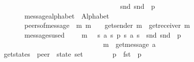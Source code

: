 \begin{isabellebody}
\ \ \ \ \ \ \ \ \ \ \ \ \ \ \ \ \ \ \ \ \ \ \ \ \ \ \ \ \ \ \ \ \ \ \ {\isacharparenleft}{\kern0pt}snd\ {\isacharparenleft}{\kern0pt}snd\ {\isacharparenleft}{\kern0pt}{\isasymA}\ p{\isacharparenright}{\kern0pt}{\isacharparenright}{\kern0pt}{\isacharparenright}{\kern0pt}{\isachardoublequoteclose}\isanewline
\ \ \ \ \ \ \ message{\isacharunderscore}{\kern0pt}alphabet{\isacharcolon}{\kern0pt}\ \ {\isachardoublequoteopen}Alphabet\ {\isasymM}{\isachardoublequoteclose}\isanewline
\ \ \ \ \ \ \ peers{\isacharunderscore}{\kern0pt}of{\isacharunderscore}{\kern0pt}message{\isacharcolon}{\kern0pt}\ \ {\isachardoublequoteopen}{\isasymAnd}m{\isachardot}{\kern0pt}\ m\ {\isasymin}\ {\isasymM}\ {\isasymLongrightarrow}\ get{\isacharunderscore}{\kern0pt}sender\ m\ {\isasymnoteq}\ get{\isacharunderscore}{\kern0pt}receiver\ m{\isachardoublequoteclose}\isanewline
\ \ \ \ \ \ \ messages{\isacharunderscore}{\kern0pt}used{\isacharcolon}{\kern0pt}\ \ \ \ \ {\isachardoublequoteopen}{\isasymforall}m\ {\isasymin}\ {\isasymM}{\isachardot}{\kern0pt}\ {\isasymexists}s{}\ a\ s{}\ p{\isachardot}{\kern0pt}\ {\isacharparenleft}{\kern0pt}s{}{\isacharcomma}{\kern0pt}\ a{\isacharcomma}{\kern0pt}\ s{}{\isacharparenright}{\kern0pt}\ {\isasymin}\ snd\ {\isacharparenleft}{\kern0pt}snd\ {\isacharparenleft}{\kern0pt}{\isasymA}\ p{\isacharparenright}{\kern0pt}{\isacharparenright}{\kern0pt}\ {\isasymand}\isanewline
\ \ \ \ \ \ \ \ \ \ \ \ \ \ \ \ \ \ \ \ \ \ \ \ \ \ \ \ \ \ m\ {\isacharequal}{\kern0pt}\ get{\isacharunderscore}{\kern0pt}message\ a{\isachardoublequoteclose}\isanewline
{}\isanewline
\isanewline
{}\isamarkupfalse%
\ get{\isacharunderscore}{\kern0pt}states\ {\isacharcolon}{\kern0pt}{\isacharcolon}{\kern0pt}\ {\isachardoublequoteopen}{\isacharprime}{\kern0pt}peer\ {\isasymRightarrow}\ {\isacharprime}{\kern0pt}state\ set{\isachardoublequoteclose}\ \ {\isacharparenleft}{\kern0pt}{\isachardoublequoteopen}{\isasymS}\ {\isacharunderscore}{\kern0pt}{\isachardoublequoteclose}\ {\isacharbrackleft}{\kern0pt}{}{}{\isacharbrackright}{\kern0pt}\ {}{}{}{\isacharparenright}{\kern0pt}\ \isanewline
\ \ {\isachardoublequoteopen}{\isasymS}{\isacharparenleft}{\kern0pt}p{\isacharparenright}{\kern0pt}\ {\isasymequiv}\ fst\ {\isacharparenleft}{\kern0pt}{\isasymA}\ p{\isacharparenright}{\kern0pt}{\isachardoublequoteclose}\isanewline
\isanewline
{}\isamarkupfalse%

\end{isabellebody}
